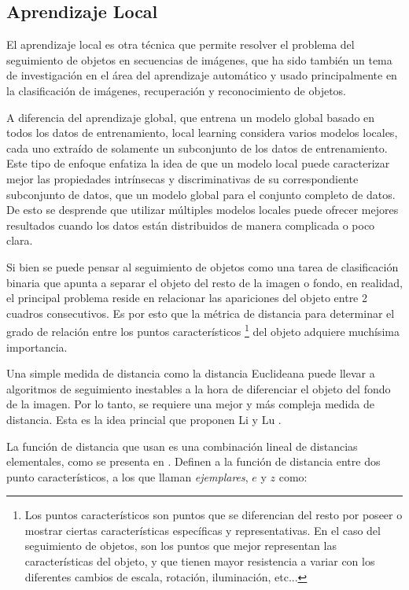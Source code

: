 \documentclass[a4paper,10pt]{article}
\begin{document}
\subsection{Aprendizaje Local}

El aprendizaje local es otra técnica que permite resolver el problema del seguimiento de objetos en secuencias de imágenes,
que ha sido también un tema de investigación en el área del aprendizaje automático \cite{local-learning-machine-learning} y usado principalmente en la clasificación
de imágenes, recuperación y reconocimiento de objetos.

A diferencia del aprendizaje global, que entrena un modelo global basado en
todos los datos de entrenamiento, local learning considera varios modelos locales, cada uno extraído de solamente un subconjunto de los datos de entrenamiento.
Este tipo de enfoque enfatiza la idea de que un modelo local puede caracterizar mejor las propiedades intrínsecas y discriminativas de su correspondiente
subconjunto de datos, que un modelo global para el conjunto completo de datos. De esto se desprende que utilizar múltiples modelos locales puede ofrecer
mejores resultados cuando los datos están distribuidos de manera complicada o poco clara.

Si bien se puede pensar al seguimiento de objetos como una tarea de clasificación binaria
que apunta a separar el objeto del resto de la imagen o fondo, en realidad, el principal
problema reside en relacionar las apariciones del objeto entre 2 cuadros
consecutivos. Es por esto que la métrica de distancia para determinar el grado de
relación entre los puntos característicos \footnote{Los puntos característicos son puntos que se diferencian del resto por poseer o mostrar
ciertas características específicas y representativas. En el caso del seguimiento de objetos, son los puntos que mejor representan las características
del objeto, y que tienen mayor resistencia a variar con los diferentes cambios de escala, rotación, iluminación, etc...}
del objeto adquiere muchísima importancia.

Una simple medida de distancia como la distancia Euclideana puede llevar a algoritmos
de seguimiento inestables a la hora de diferenciar el objeto del fondo de la imagen. Por
lo tanto, se requiere una mejor y más compleja medida de distancia. Esta
es la idea princial que proponen Li y Lu \cite{local-learning}.

La función de distancia que usan es una combinación lineal de distancias elementales,
como se presenta en \cite{malisiewicz-cvpr08}. Definen a la función de distancia entre dos
punto característicos, a los que llaman \textit{ejemplares}, $e$ y $z$ como:
\end{document}
